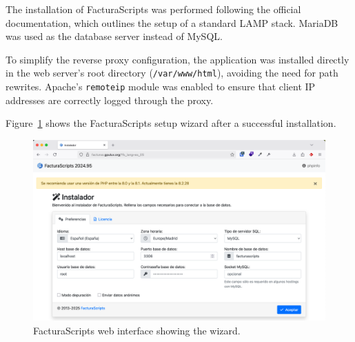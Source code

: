 The installation of FacturaScripts was performed following the official documentation\cite{facturascripts-install-linux}, which outlines the setup of a standard LAMP stack. MariaDB was used as the database server instead of MySQL.

To simplify the reverse proxy configuration, the application was installed directly in the web server's root directory (\texttt{/var/www/html}), avoiding the need for path rewrites. Apache's \texttt{remoteip} module was enabled to ensure that client IP addresses are correctly logged through the proxy.

Figure~\ref{fig:facturascripts-ui} shows the FacturaScripts setup wizard after a successful installation.

\begin{figure}[H]
	\centering
	\includegraphics[width=\textwidth]{imaxes/facturascripts-wizard.png}
	\caption{FacturaScripts web interface showing the wizard.}
	\label{fig:facturascripts-ui}
\end{figure}
